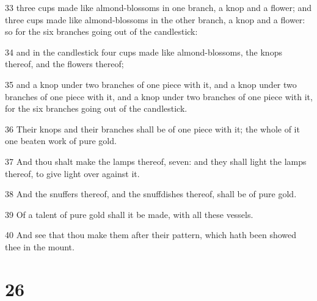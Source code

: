 \par 33 three cups made like almond-blossoms in one branch, a knop and a flower; and three cups made like almond-blossoms in the other branch, a knop and a flower: so for the six branches going out of the candlestick:
\par 34 and in the candlestick four cups made like almond-blossoms, the knops thereof, and the flowers thereof;
\par 35 and a knop under two branches of one piece with it, and a knop under two branches of one piece with it, and a knop under two branches of one piece with it, for the six branches going out of the candlestick.
\par 36 Their knops and their branches shall be of one piece with it; the whole of it one beaten work of pure gold.
\par 37 And thou shalt make the lamps thereof, seven: and they shall light the lamps thereof, to give light over against it.
\par 38 And the snuffers thereof, and the snuffdishes thereof, shall be of pure gold.
\par 39 Of a talent of pure gold shall it be made, with all these vessels.
\par 40 And see that thou make them after their pattern, which hath been showed thee in the mount.

\chapter{26}

